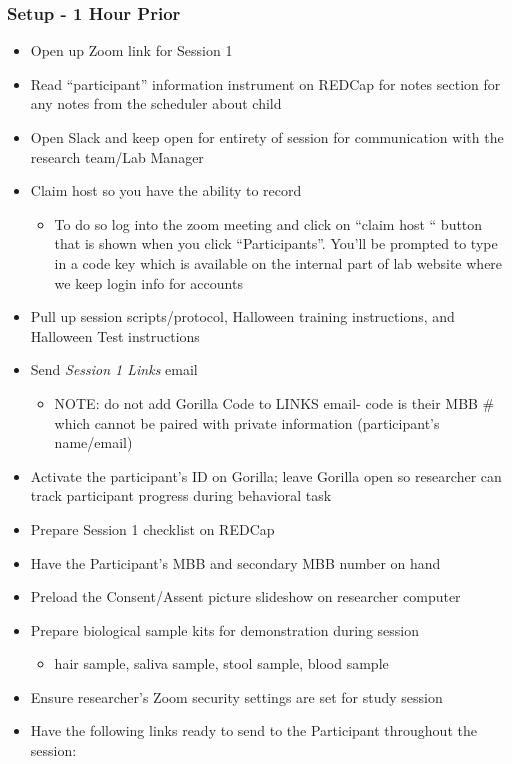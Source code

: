 \documentclass[]{book}
\providecommand{\tightlist}{%
  \setlength{\itemsep}{0pt}\setlength{\parskip}{0pt}}
\begin{document}
\hypertarget{setup---1-hour-prior-2}{%
\subsubsection{Setup - 1 Hour Prior}\label{setup---1-hour-prior-2}}

\begin{itemize}
\tightlist
\item
  Open up Zoom link for Session 1
\item
  Read ``participant'' information instrument on REDCap for notes section for any notes from the scheduler about child
\item
  Open Slack and keep open for entirety of session for communication with the research team/Lab Manager
\item
  Claim host so you have the ability to record

  \begin{itemize}
  \tightlist
  \item
    To do so log into the zoom meeting and click on ``claim host `` button that is shown when you click ``Participants''. You'll be prompted to type in a code key which is available on the internal part of lab website where we keep login info for accounts
  \end{itemize}
\item
  Pull up session scripts/protocol, Halloween training instructions, and Halloween Test instructions
\item
  Send \emph{Session 1 Links} email

  \begin{itemize}
  \tightlist
  \item
    NOTE: do not add Gorilla Code to LINKS email- code is their MBB \# which cannot be paired with private information (participant's name/email)
  \end{itemize}
\item
  Activate the participant's ID on Gorilla; leave Gorilla open so researcher can track participant progress during behavioral task
\item
  Prepare Session 1 checklist on REDCap
\item
  Have the Participant's MBB and secondary MBB number on hand
\item
  Preload the Consent/Assent picture slideshow on researcher computer
\item
  Prepare biological sample kits for demonstration during session

  \begin{itemize}
  \tightlist
  \item
    hair sample, saliva sample, stool sample, blood sample\\
  \end{itemize}
\item
  Ensure researcher's Zoom security settings are set for study session
\item
  Have the following links ready to send to the Participant throughout the session:


\end{itemize}
\end{document}
